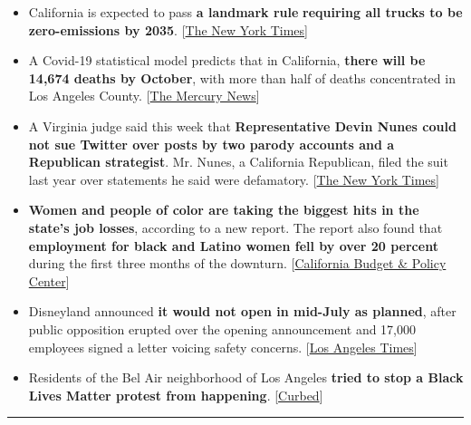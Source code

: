 \begin{itemize}
\item
  California is expected to pass \textbf{a landmark rule}
  \textbf{requiring all trucks to be zero-emissions by 2035}.
  {[}\href{https://www.nytimes3xbfgragh.onion/2020/06/25/climate/zero-emissions-trucks-california.html}{The
  New York Times}{]}
\item
  A Covid-19 statistical model predicts that in California,
  \textbf{there will be 14,674 deaths by October}, with more than half
  of deaths concentrated in Los Angeles County.
  {[}\href{https://www.mercurynews.com/2020/06/25/graph-half-of-californias-coronavirus-deaths-by-oct-1-projected-in-los-angeles-county/?utm_medium=social\&utm_source=twitter.com\&utm_campaign=socialflow\&utm_content=tw-mercnews}{The
  Mercury News}{]}
\item
  A Virginia judge said this week that \textbf{Representative Devin
  Nunes could not sue Twitter over posts by two parody accounts and a
  Republican strategist}. Mr. Nunes, a California Republican, filed the
  suit last year over statements he said were defamatory.
  {[}\href{https://www.nytimes3xbfgragh.onion/2020/06/25/us/politics/devin-nunes-cow-tweets.html?smid=tw-nytimes\&smtyp=cur}{The
  New York Times}{]}
\item
  \textbf{Women and people of color are taking the biggest hits in the
  state's job losses}, according to a new report. The report also found
  that \textbf{employment for black and Latino women fell by over 20
  percent} during the first three months of the downturn.
  {[}\href{https://calbudgetcenter.org/resources/women-poc-take-hits-in-californias-job-loss/}{California
  Budget \& Policy Center}{]}
\item
  Disneyland announced \textbf{it would not open in mid-July as
  planned}, after public opposition erupted over the opening
  announcement and 17,000 employees signed a letter voicing safety
  concerns.
  {[}\href{https://www.latimes.com/entertainment-arts/story/2020-06-24/disneyland-delay-reopen-july-17}{Los
  Angeles Times}{]}
\item
  Residents of the Bel Air neighborhood of Los Angeles \textbf{tried to
  stop a Black Lives Matter protest from happening}.
  {[}\href{https://la.curbed.com/2020/6/25/21289758/bel-air-black-lives-matter-los-angeles}{Curbed}{]}
\end{itemize}

\begin{center}\rule{0.5\linewidth}{\linethickness}\end{center}

